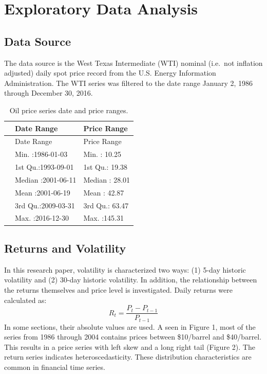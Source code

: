 \documentclass[11pt,]{article}
\begin{document}
\section{Exploratory Data Analysis}\label{exploratory-data-analysis}

\subsection{Data Source}\label{data-source}

The data source is the West Texas Intermediate (WTI) nominal (i.e.~not
inflation adjusted) daily spot price record from the U.S. Energy
Information Administration. The WTI series was filtered to the date
range January 2, 1986 through December 30, 2016.

\begin{longtable}[]{@{}lll@{}}
\caption{Oil price series date and price ranges.}\tabularnewline
\toprule
& Date Range & Price Range\tabularnewline
\midrule
\endfirsthead
\toprule
& Date Range & Price Range\tabularnewline
\midrule
\endhead
& Min. :1986-01-03 & Min. : 10.25\tabularnewline
& 1st Qu.:1993-09-01 & 1st Qu.: 19.38\tabularnewline
& Median :2001-06-11 & Median : 28.01\tabularnewline
& Mean :2001-06-19 & Mean : 42.87\tabularnewline
& 3rd Qu.:2009-03-31 & 3rd Qu.: 63.47\tabularnewline
& Max. :2016-12-30 & Max. :145.31\tabularnewline
\bottomrule
\end{longtable}

\subsection{Returns and Volatility}\label{returns-and-volatility}

In this research paper, volatility is characterized two ways: (1) 5-day
historic volatility and (2) 30-day historic volatility. In addition, the
relationship between the returns themselves and price level is
investigated. Daily returns were calculated as:
\[R_t = \frac{P_t-P_{t-1}}{P_{t-1}}\] In some sections, their absolute
values are used. A seen in Figure 1, most of the series from 1986
through 2004 contains prices between \$10/barrel and \$40/barrel. This
results in a price series with left skew and a long right tail (Figure
2). The return series indicates heteroscedasticity. These distribution
characteristics are common in financial time series.
\end{document}

